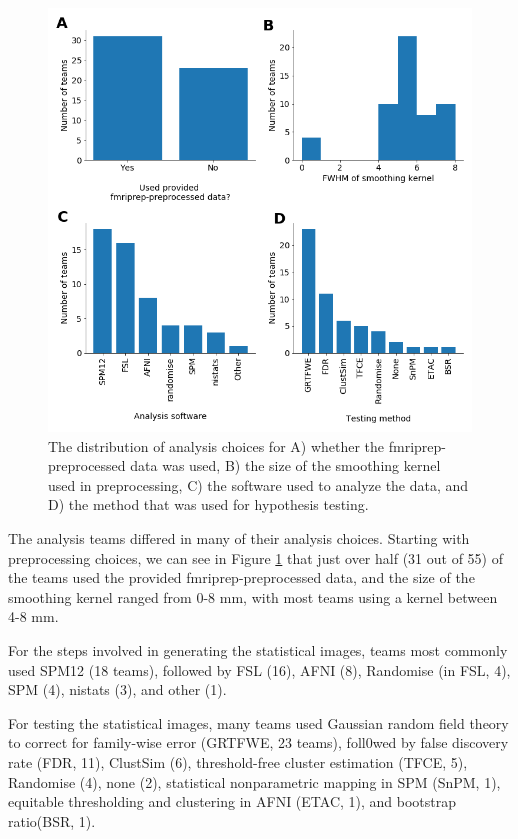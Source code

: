 \documentclass[a4paper,doc,natbib]{apa6}
\begin{document}
\begin{figure}[!htb]
	\includegraphics[width=\textwidth]
	{figures/result1A_methods_histograms.png}
	\caption{\label{fig:1Ahists} The distribution of analysis choices for A) whether the fmriprep-preprocessed data was used, B) the size of the smoothing kernel used in preprocessing, C) the software used to analyze the data, and D) the method that was used for hypothesis testing.}
\end{figure}

The analysis teams differed in many of their analysis choices. Starting with preprocessing choices, we can see in Figure \ref{fig:1Ahists} that just over half (31 out of 55) of the teams used the provided fmriprep-preprocessed data, and the size of the smoothing kernel ranged from 0-8 mm, with most teams using a kernel between 4-8 mm. 

For the steps involved in generating the statistical images, teams most commonly used SPM12 (18 teams), followed by FSL (16), AFNI (8), Randomise (in FSL, 4), SPM (4), nistats (3), and other (1). 

For testing the statistical images, many teams used Gaussian random field theory to correct for family-wise error (GRTFWE, 23 teams), foll0wed by false discovery rate (FDR, 11), ClustSim (6), threshold-free cluster estimation (TFCE, 5), Randomise (4), none (2), statistical nonparametric mapping in SPM (SnPM, 1), equitable thresholding and clustering in AFNI (ETAC, 1), and bootstrap ratio(BSR, 1).
\end{document}
